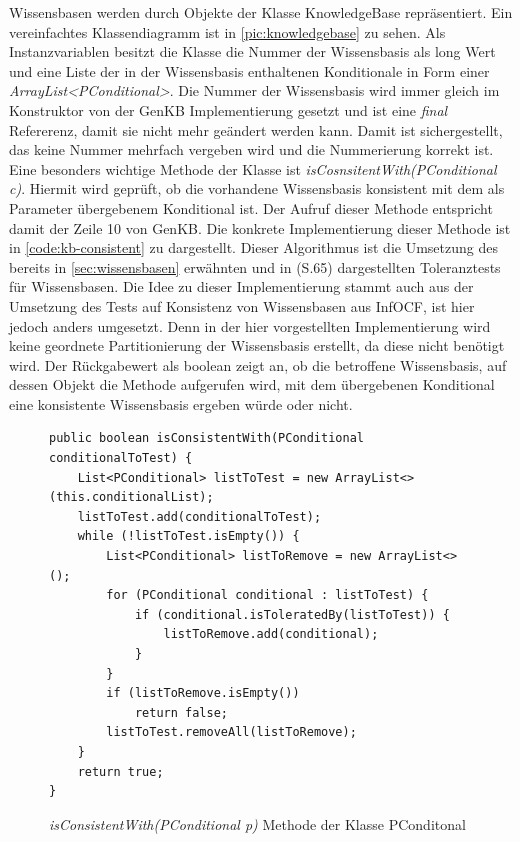 \documentclass[12pt,a4paper]{article}
\begin{document}
Wissensbasen werden durch Objekte der Klasse KnowledgeBase repräsentiert. Ein vereinfachtes Klassendiagramm ist in \autoref{pic:knowledgebase} zu sehen. Als Instanzvariablen besitzt die Klasse die Nummer der Wissensbasis als long Wert und eine Liste der in der Wissensbasis enthaltenen Konditionale in Form einer \textit{ArrayList<PConditional>}. Die Nummer der Wissensbasis wird immer gleich im Konstruktor von der GenKB Implementierung gesetzt und ist eine \textit{final} Refererenz, damit sie nicht mehr geändert werden kann. Damit ist sichergestellt, das keine Nummer mehrfach vergeben wird und die Nummerierung korrekt ist.\\
Eine besonders wichtige Methode der Klasse ist \textit{isCosnsitentWith(PConditional c)}. Hiermit wird geprüft, ob die vorhandene Wissensbasis konsistent mit dem als Parameter übergebenem Konditional ist. Der Aufruf dieser Methode entspricht damit der Zeile 10 von GenKB. Die konkrete Implementierung dieser Methode ist in \autoref{code:kb-consistent} zu dargestellt. Dieser Algorithmus ist die Umsetzung des bereits in \autoref{sec:wissensbasen} erwähnten und in \cite{goldszmidt96}(S.65) dargestellten Toleranztests für Wissensbasen.  Die Idee zu dieser Implementierung stammt auch aus der Umsetzung des Tests auf Konsistenz von Wissensbasen aus InfOCF, ist hier jedoch anders umgesetzt. Denn in der hier vorgestellten Implementierung wird keine geordnete Partitionierung der Wissensbasis erstellt, da diese nicht benötigt wird. Der Rückgabewert als boolean zeigt an, ob die betroffene Wissensbasis, auf dessen Objekt die Methode aufgerufen wird, mit dem übergebenen Konditional eine konsistente Wissensbasis ergeben würde oder nicht.


\begin{figure}
\begin{lstlisting}
public boolean isConsistentWith(PConditional conditionalToTest) {
    List<PConditional> listToTest = new ArrayList<>(this.conditionalList);
    listToTest.add(conditionalToTest);
    while (!listToTest.isEmpty()) {
        List<PConditional> listToRemove = new ArrayList<>();
        for (PConditional conditional : listToTest) {
            if (conditional.isToleratedBy(listToTest)) {
                listToRemove.add(conditional);
            }
        }
        if (listToRemove.isEmpty())
            return false;
        listToTest.removeAll(listToRemove);
    }
    return true;
}
\end{lstlisting}
\caption{\textit{isConsistentWith(PConditional p)} Methode der Klasse PConditonal}
\label{code:kb-consistent}
\end{figure} 
\end{document}
